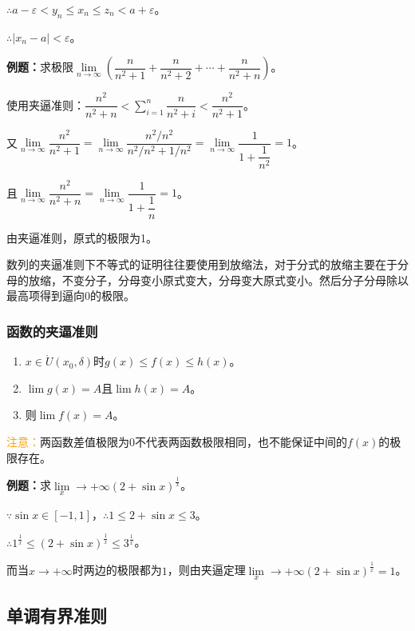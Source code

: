 \documentclass[UTF8, 12pt]{ctexart}
\begin{document}
$\therefore a-\varepsilon<y_n\leqslant x_n\leqslant z_n<a+\varepsilon$。

$\therefore\vert x_n-a\vert<\varepsilon$。

\textbf{例题：}求极限$\lim\limits_{n\to\infty}\left(\dfrac{n}{n^2+1}+\dfrac{n}{n^2+2}+\cdots+\dfrac{n}{n^2+n}\right)$。

使用夹逼准则：$\dfrac{n^2}{n^2+n}<\sum_{i=1}^n\dfrac{n}{n^2+i}<\dfrac{n^2}{n^2+1}$。

又$\lim\limits_{n\to\infty}\dfrac{n^2}{n^2+1}=\lim\limits_{n\to\infty}\dfrac{n^2/n^2}{n^2/n^2+1/n^2}=\lim\limits_{n\to\infty}\dfrac{1}{1+\dfrac{1}{n^2}}=1$。

且$\lim\limits_{n\to\infty}\dfrac{n^2}{n^2+n}=\lim\limits_{n\to\infty}\dfrac{1}{1+\dfrac{1}{n}}=1$。

由夹逼准则，原式的极限为1。

数列的夹逼准则下不等式的证明往往要使用到放缩法，对于分式的放缩主要在于分母的放缩，不变分子，分母变小原式变大，分母变大原式变小。然后分子分母除以最高项得到逼向0的极限。

\subsubsection{函数的夹逼准则}

\begin{enumerate}
    \item $x\in\mathring{U}(x_0,\delta)$时$g(x)\leqslant f(x)\leqslant h(x)$。
    \item $\lim g(x)=A$且$\lim h(x)=A$。
    \item 则$\lim f(x)=A$。
\end{enumerate}

\textcolor{orange}{注意：}两函数差值极限为0不代表两函数极限相同，也不能保证中间的$f(x)$的极限存在。

\textbf{例题：}求$\lim\limits_x\to+\infty(2+\sin x)^{\frac{1}{x}}$。

$\because \sin x\in[-1,1]$，$\therefore 1\leqslant 2+\sin x\leqslant 3$。

$\therefore 1^{\frac{1}{x}}\leqslant\left(2+\sin x\right)^{\frac{1}{x}}\leqslant 3^{\frac{1}{x}}$。

而当$x\to+\infty$时两边的极限都为$1$，则由夹逼定理$\lim\limits_x\to+\infty(2+\sin x)^{\frac{1}{x}}=1$。

\subsection{单调有界准则}
\end{document}
